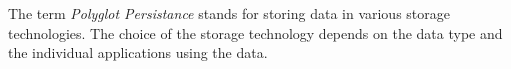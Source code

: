 \begin{exercise}{5}

  \begin{subexercise}
    The term \emph{Polyglot Persistance} stands for storing data in various
    storage technologies. The choice of the storage technology depends on the
    data type and the individual applications using the data.
  \end{subexercise}

  \begin{subexercise}
    \begin{lstlisting}
    \end{lstlisting}
  \end{subexercise}

\end{exercise}

